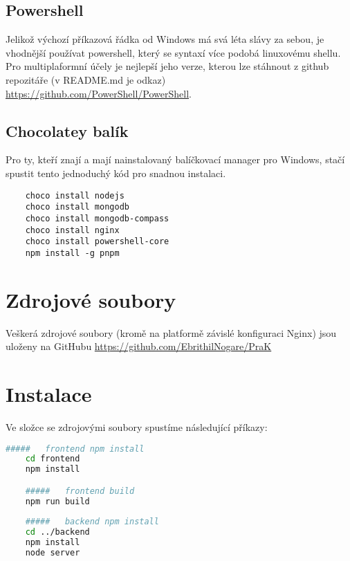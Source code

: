 \subsection{Powershell}
Jelikož výchozí příkazová řádka od Windows má svá léta slávy za sebou, je
vhodnější používat powershell, který se syntaxí více podobá linuxovému shellu.
Pro multiplaformní účely je nejlepší jeho  verze, kterou lze stáhnout
z github repozitáře (v README.md je odkaz) \url{https://github.com/PowerShell/PowerShell}.

\subsection{Chocolatey balík}
Pro ty, kteří znají a mají nainstalovaný balíčkovací manager  pro Windows, 
stačí spustit tento jednoduchý kód pro snadnou instalaci.
\begin{lstlisting}
	choco install nodejs
	choco install mongodb
	choco install mongodb-compass
	choco install nginx
	choco install powershell-core
	npm install -g pnpm
\end{lstlisting}

\section{Zdrojové soubory}
Veškerá zdrojové soubory (kromě na platformě závislé konfiguraci Nginx)
jsou uloženy na GitHubu \url{https://github.com/EbrithilNogare/PraK}

\section{Instalace}
Ve složce se zdrojovými soubory spustíme následující příkazy:
\begin{lstlisting}[language=bash]
	#####   frontend npm install
	cd frontend
	npm install

	#####   frontend build
	npm run build
	
	#####   backend npm install
	cd ../backend
	npm install
	node server
\end{lstlisting}
